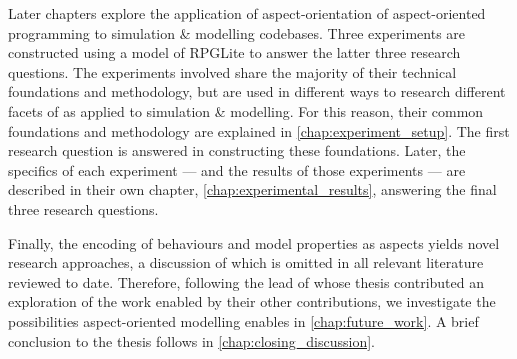Later chapters explore the application of aspect-orientation of aspect-oriented
programming to simulation \& modelling codebases. Three experiments are
constructed using a model of RPGLite to answer the latter three research
questions. The experiments involved share the majority of their technical
foundations and methodology, but are used in different ways to research
different facets of \aop{} as applied to simulation \& modelling. For this
reason, their common foundations and methodology are explained in
\cref{chap:experiment_setup}. The first research question is answered in
constructing these foundations. Later, the specifics of each experiment --- and
the results of those experiments --- are described in their own chapter,
\cref{chap:experimental_results}, answering the final three research questions.

Finally, the encoding of behaviours and model properties as aspects yields novel
research approaches, a discussion of which is omitted in all relevant literature
reviewed to date. Therefore, following the lead of \citet{marsh1994formalising}
whose thesis contributed an exploration of the work enabled by their other
contributions, we investigate the possibilities aspect-oriented modelling
enables in \cref{chap:future_work}. A brief conclusion to the thesis follows in
\cref{chap:closing_discussion}.







